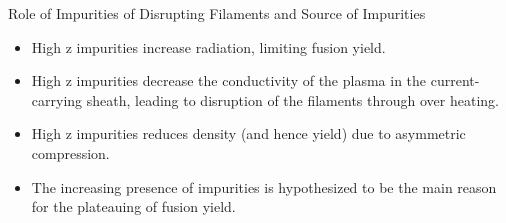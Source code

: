 \begin{frame} {Role of Impurities of Disrupting Filaments and Source of Impurities}
    \begin{itemize}
        \item High z impurities increase radiation, limiting fusion yield.
        \item High z impurities decrease the conductivity of the plasma in the current-carrying sheath, leading to disruption of the filaments through over heating.
        \item High z impurities reduces density (and hence yield) due to asymmetric compression.
        \item The increasing presence of impurities is hypothesized to be the main reason for the plateauing of fusion yield.
    \end{itemize}
\end{frame}
